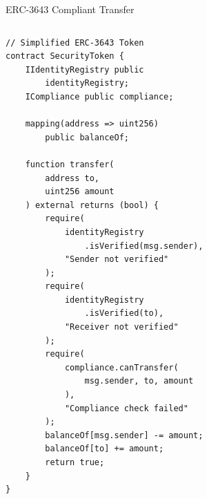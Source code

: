 \documentclass[8pt,aspectratio=169]{beamer}
\begin{document}
\begin{frame}[fragile]{ERC-3643 Compliant Transfer}
\begin{columns}[T]
\begin{lstlisting}
// Simplified ERC-3643 Token
contract SecurityToken {
    IIdentityRegistry public
        identityRegistry;
    ICompliance public compliance;

    mapping(address => uint256)
        public balanceOf;

    function transfer(
        address to,
        uint256 amount
    ) external returns (bool) {
        require(
            identityRegistry
                .isVerified(msg.sender),
            "Sender not verified"
        );
        require(
            identityRegistry
                .isVerified(to),
            "Receiver not verified"
        );
        require(
            compliance.canTransfer(
                msg.sender, to, amount
            ),
            "Compliance check failed"
        );
        balanceOf[msg.sender] -= amount;
        balanceOf[to] += amount;
        return true;
    }
}
\end{lstlisting}


\end{columns}
\end{frame}
\end{document}
